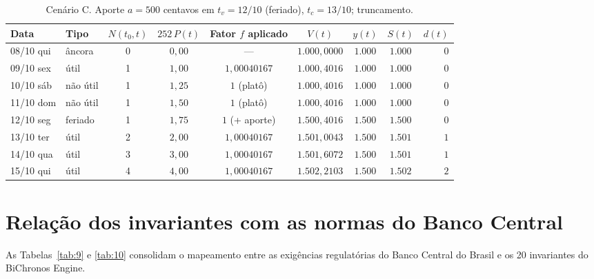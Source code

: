 \documentclass[11pt, a4paper]{article}
\theoremstyle{definition}
\theoremstyle{plain}
\theoremstyle{remark}
\begin{document}
\begin{table}[htbp]
\centering
\small
\begin{tabular}{@{}llccccccr@{}}
\toprule
\textbf{Data} & \textbf{Tipo} & $N(t_0, t)$ & $252\,P(t)$ & \textbf{Fator $f$ aplicado} & $V(t)$ & $y(t)$ & $S(t)$ & $d(t)$ \\
\midrule
08/10 qui & âncora   & 0 & $0{,}00$ & ---            & $1.000{,}0000$ & $1.000$ & $1.000$ & $0$ \\
09/10 sex & útil     & 1 & $1{,}00$ & $1{,}00040167$ & $1.000{,}4016$ & $1.000$ & $1.000$ & $0$ \\
10/10 sáb & não útil & 1 & $1{,}25$ & $1$ (platô)    & $1.000{,}4016$ & $1.000$ & $1.000$ & $0$ \\
11/10 dom & não útil & 1 & $1{,}50$ & $1$ (platô)    & $1.000{,}4016$ & $1.000$ & $1.000$ & $0$ \\
12/10 seg & feriado  & 1 & $1{,}75$ & $1$ (+ aporte) & $1.500{,}4016$ & $1.500$ & $1.500$ & $0$ \\
13/10 ter & útil     & 2 & $2{,}00$ & $1{,}00040167$ & $1.501{,}0043$ & $1.500$ & $1.501$ & $1$ \\
14/10 qua & útil     & 3 & $3{,}00$ & $1{,}00040167$ & $1.501{,}6072$ & $1.500$ & $1.501$ & $1$ \\
15/10 qui & útil     & 4 & $4{,}00$ & $1{,}00040167$ & $1.502{,}2103$ & $1.500$ & $1.502$ & $2$ \\
\bottomrule
\end{tabular}
\caption{Cenário C. Aporte $a = 500$ centavos em $t_v = 12/10$ (feriado), $t_c = 13/10$; truncamento.}
\label{tab:8}
\end{table}

\section{Relação dos invariantes com as normas do Banco Central}\label{sec:8}

As Tabelas~\ref{tab:9} e \ref{tab:10} consolidam o mapeamento entre as exigências regulatórias do Banco Central do Brasil e os 20 invariantes do BiChronos Engine.
\end{document}
